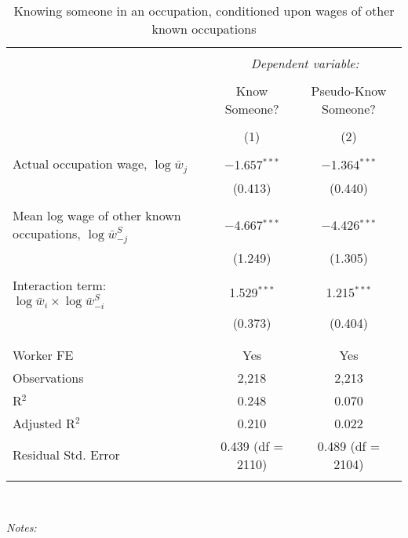 
\begin{table}[!htbp] \centering 
  \caption{Knowing someone in an occupation, conditioned upon wages of other known occupations} 
  \label{tab:clustering} 
\begin{tabular}{@{\extracolsep{5pt}}lcc} 
\\[-1.8ex]\hline 
\hline \\[-1.8ex] 
 & \multicolumn{2}{c}{\textit{Dependent variable:}} \\ 
\cline{2-3} 
\\[-1.8ex] & Know Someone? & Pseudo-Know Someone? \\ 
\\[-1.8ex] & (1) & (2)\\ 
\hline \\[-1.8ex] 
 Actual occupation wage, $\log \bar{w}_j$ & $-$1.657$^{***}$ & $-$1.364$^{***}$ \\ 
  & (0.413) & (0.440) \\ 
  & & \\ 
 Mean log wage of other known occupations, $\log \bar{w}^S_{-j}$ & $-$4.667$^{***}$ & $-$4.426$^{***}$ \\ 
  & (1.249) & (1.305) \\ 
  & & \\ 
 Interaction term: $\log \bar{w}_i \times \log \bar{w}^S_{-i}$ & 1.529$^{***}$ & 1.215$^{***}$ \\ 
  & (0.373) & (0.404) \\ 
  & & \\ 
\hline \\[-1.8ex] 
Worker FE & Yes & Yes \\ 
Observations & 2,218 & 2,213 \\ 
R$^{2}$ & 0.248 & 0.070 \\ 
Adjusted R$^{2}$ & 0.210 & 0.022 \\ 
Residual Std. Error & 0.439 (df = 2110) & 0.489 (df = 2104) \\ 
\hline 
\hline \\[-1.8ex] 
\end{tabular}
\\
\begin{minipage}{0.95 \textwidth}
{\footnotesize \emph{Notes:}
           

           \starlanguage }
\end{minipage}
\end{table}

